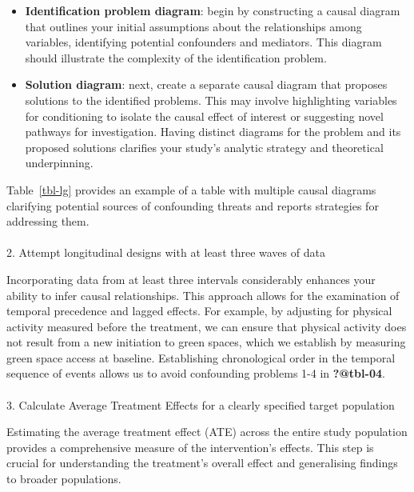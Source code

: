 \documentclass[
  single column]{article}
\makeatletter
\let\oldparagraph\paragraph
\renewcommand{\paragraph}{
    \@ifstar
      \xxxParagraphStar
      \xxxParagraphNoStar
  }
\newcommand{\xxxParagraphStar}[1]{\oldparagraph*{#1}\mbox{}}
\newcommand{\xxxParagraphNoStar}[1]{\oldparagraph{#1}\mbox{}}
\providecommand{\tightlist}{%
  \setlength{\itemsep}{0pt}\setlength{\parskip}{0pt}}\usepackage{longtable,booktabs,array}
\makeatother
\begin{document}
\begin{itemize}
\tightlist
\item
  \textbf{Identification problem diagram}: begin by constructing a
  causal diagram that outlines your initial assumptions about the
  relationships among variables, identifying potential confounders and
  mediators. This diagram should illustrate the complexity of the
  identification problem.
\item
  \textbf{Solution diagram}: next, create a separate causal diagram that
  proposes solutions to the identified problems. This may involve
  highlighting variables for conditioning to isolate the causal effect
  of interest or suggesting novel pathways for investigation. Having
  distinct diagrams for the problem and its proposed solutions clarifies
  your study's analytic strategy and theoretical underpinning.
\end{itemize}

Table~\ref{tbl-lg} provides an example of a table with multiple causal
diagrams clarifying potential sources of confounding threats and reports
strategies for addressing them.

\paragraph{2. Attempt longitudinal designs with at least three waves of
data}\label{attempt-longitudinal-designs-with-at-least-three-waves-of-data}

Incorporating data from at least three intervals considerably enhances
your ability to infer causal relationships. This approach allows for the
examination of temporal precedence and lagged effects. For example, by
adjusting for physical activity measured before the treatment, we can
ensure that physical activity does not result from a new initiation to
green spaces, which we establish by measuring green space access at
baseline. Establishing chronological order in the temporal sequence of
events allows us to avoid confounding problems 1-4 in \textbf{?@tbl-04}.

\paragraph{3. Calculate Average Treatment Effects for a clearly
specified target
population}\label{calculate-average-treatment-effects-for-a-clearly-specified-target-population}

Estimating the average treatment effect (ATE) across the entire study
population provides a comprehensive measure of the intervention's
effects. This step is crucial for understanding the treatment's overall
effect and generalising findings to broader populations.
\end{document}
